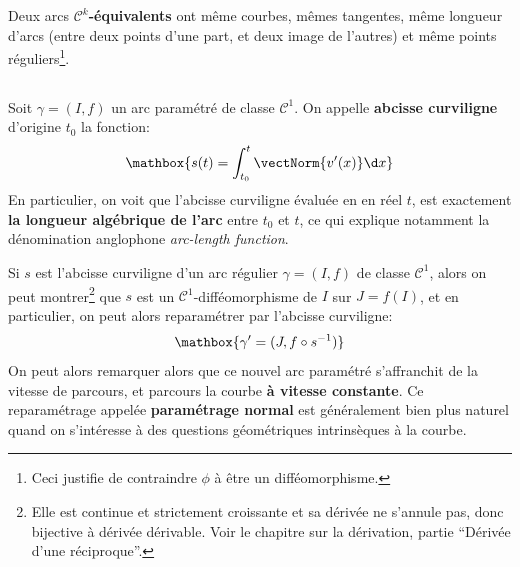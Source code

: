 Deux arcs \(\mathcal{C}^k\)\textbf{-équivalents} ont même courbes, mêmes tangentes, même longueur d'arcs (entre deux points d'une part, et deux image de l'autres) et même points réguliers\footnote[2]{Ceci justifie de contraindre \(\phi\) à être un difféomorphisme.}.

\subsection*{}
Soit \(\gamma = (I, f)\) un arc paramétré de classe \(\mathcal{C}^1\). On appelle \textbf{abcisse curviligne} d'origine \(t_0\) la fonction:
\[
   \mathbox{s(t) = \int_{t_0}^{t} \vectNorm{v'(x)} \d x}  
\]
En particulier, on voit que l'abcisse curviligne évaluée en en réel \(t\), est exactement \textbf{la longueur algébrique de l'arc} entre \(t_0\) et \(t\), ce qui explique notamment la dénomination anglophone \textit{arc-length function}.\<

Si \(s\) est l'abcisse curviligne d'un arc régulier \(\gamma = (I, f)\) de classe \(\mathcal{C}^1\), alors on peut montrer\footnote[3]{Elle est continue et strictement croissante et sa dérivée ne s'annule pas, donc bijective à dérivée dérivable. Voir le chapitre sur la dérivation, partie ``Dérivée d'une réciproque''.} que \(s\) est un \(\mathcal{C}^1\)-difféomorphisme de \(I\) sur \(J = f(I)\), et en particulier, on peut alors reparamétrer par l'abcisse curviligne:
\[
   \mathbox{\gamma' = (J, f \circ s^{-1})}   
\]
On peut alors remarquer alors que ce nouvel arc paramétré s'affranchit de la vitesse de parcours, et parcours la courbe \textbf{à vitesse constante}. Ce reparamétrage appelée \textbf{paramétrage normal} est généralement bien plus naturel quand on s'intéresse à des questions géométriques intrinsèques à la courbe.